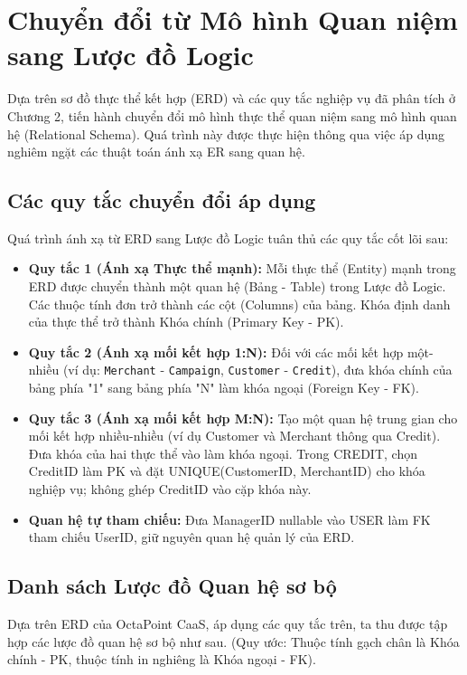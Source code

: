 \section{Chuyển đổi từ Mô hình Quan niệm sang Lược đồ Logic}

Dựa trên sơ đồ thực thể kết hợp (ERD) và các quy tắc nghiệp vụ đã phân tích ở Chương 2, tiến hành chuyển đổi mô hình thực thể quan niệm sang mô hình quan hệ (Relational Schema). Quá trình này được thực hiện thông qua việc áp dụng nghiêm ngặt các thuật toán ánh xạ ER sang quan hệ.

\subsection{Các quy tắc chuyển đổi áp dụng}
Quá trình ánh xạ từ ERD sang Lược đồ Logic tuân thủ các quy tắc cốt lõi sau:

\begin{itemize}
    \item \textbf{Quy tắc 1 (Ánh xạ Thực thể mạnh):} Mỗi thực thể (Entity) mạnh trong ERD được chuyển thành một quan hệ (Bảng - Table) trong Lược đồ Logic. Các thuộc tính đơn trở thành các cột (Columns) của bảng. Khóa định danh của thực thể trở thành Khóa chính (Primary Key - PK).
    
    \item \textbf{Quy tắc 2 (Ánh xạ mối kết hợp 1:N):} Đối với các mối kết hợp một-nhiều (ví dụ: \texttt{Merchant} - \texttt{Campaign}, \texttt{Customer} - \texttt{Credit}), đưa khóa chính của bảng phía "1" sang bảng phía "N" làm khóa ngoại (Foreign Key - FK).
    
    \item \textbf{Quy tắc 3 (Ánh xạ mối kết hợp M:N):} Tạo một quan hệ trung gian cho mối kết hợp nhiều-nhiều (ví dụ Customer và Merchant thông qua Credit). Đưa khóa của hai thực thể vào làm khóa ngoại. Trong CREDIT, chọn CreditID làm PK và đặt UNIQUE(CustomerID, MerchantID) cho khóa nghiệp vụ; không ghép CreditID vào cặp khóa này.
    \item \textbf{Quan hệ tự tham chiếu:} Đưa ManagerID nullable vào USER làm FK tham chiếu UserID, giữ nguyên quan hệ quản lý của ERD.
\end{itemize}

\subsection{Danh sách Lược đồ Quan hệ sơ bộ}
Dựa trên ERD của OctaPoint CaaS, áp dụng các quy tắc trên, ta thu được tập hợp các lược đồ quan hệ sơ bộ như sau. (Quy ước: Thuộc tính gạch chân là Khóa chính - PK, thuộc tính in nghiêng là Khóa ngoại - FK).

